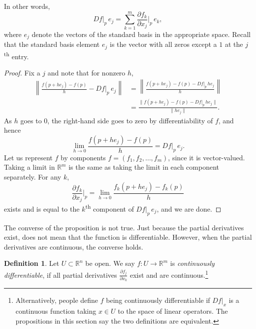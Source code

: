 \documentclass[12pt,openany]{book}
\newcommand{\snorm}[1]{\lVert {#1} \rVert}
\newcommand{\norm}[1]{\left\lVert {#1} \right\rVert}
\newcommand{\R}{{\mathbb{R}}}
\newcommand{\myindex}[1]{#1\index{#1}}
\theoremstyle{plain}
\theoremstyle{remark}
\theoremstyle{definition}
\newtheorem{defn}[thm]{Definition}
\theoremstyle{exercise}
\theoremstyle{example}
\begin{document}
In other words,
\begin{equation*}
Df|_p \, e_j =
\sum_{k=1}^m
\frac{\partial f_k}{\partial x_j}\Big|_p \,e_k ,
\end{equation*}
where $e_j$ denote the vectors of the standard basis in the appropriate
space.  Recall that the standard basis element $e_j$ is the vector with all
zeros except a $1$ at the $j$\textsuperscript{th} entry.

\begin{proof}
Fix a $j$ and note that for nonzero $h$,
\begin{equation*}
\begin{split}
\norm{\frac{f(p+h e_j)-f(p)}{h} - Df|_p \, e_j} & = 
\norm{\frac{f(p+h e_j)-f(p) - Df|_p \, h e_j}{h}} \\
& =
\frac{\snorm{f(p+h e_j)-f(p) - Df|_p \, h e_j}}{\snorm{h e_j}} .
\end{split}
\end{equation*}
As $h$ goes to $0$, the right-hand side goes to zero by
differentiability of $f$, and hence
\begin{equation*}
\lim_{h \to 0}
\frac{f(p+h e_j)-f(p)}{h} = Df|_p \, e_j  .
\end{equation*}
Let us represent $f$ by components
$f = (f_1,f_2,\ldots,f_m)$, since it is vector-valued.
Taking a limit in $\R^m$
is the same as taking the limit in each component separately.  
For any $k$,
\begin{equation*}
\frac{\partial f_k}{\partial x_j} \Big|_p
=
\lim_{h \to 0}
\frac{f_k(p+h e_j)-f_k(p)}{h}
\end{equation*}
exists and 
is equal to the $k$\textsuperscript{th} component of $Df|_p\, e_j$, and we are done.
\end{proof}

The converse of the proposition is not true.  Just because the partial
derivatives exist, does not mean that the function is differentiable.
However, when the partial derivatives are continuous, the
converse holds.


\begin{defn}
Let $U \subset \R^n$ be open.
We say $f \colon U \to \R^m$ is
\emph{\myindex{continuously differentiable}},
if all partial derivatives
$\frac{\partial f_j}{\partial x_k}$ exist and are continuous.\footnote{%
Alternatively, people define $f$ being continuously differentiable
if $Df|_x$ is a continuous function taking $x \in U$ to the space of linear
operators.  The propositions in this section say the two definitions are equivalent.}
\end{defn}
\end{document}

